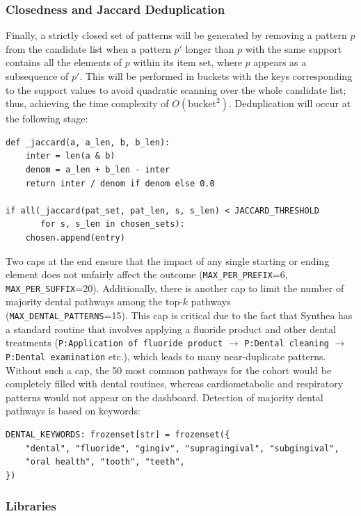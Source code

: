 \subsubsection*{Closedness and Jaccard Deduplication}

Finally, a strictly closed set of patterns will be generated by removing a pattern \(p\) from the candidate list when a pattern \(p'\) longer than \(p\) with the same support contains all the elements of \(p\) within its item set, where \(p\) appears as a subsequence of \(p'\). This will be performed in buckets with the keys corresponding to the support values to avoid quadratic scanning over the whole candidate list; thus, achieving the time complexity of \(O(\text{bucket}^2)\). Deduplication will occur at the following stage:

\begin{lstlisting}[style=pythonstyle]
def _jaccard(a, a_len, b, b_len):
    inter = len(a & b)
    denom = a_len + b_len - inter
    return inter / denom if denom else 0.0

if all(_jaccard(pat_set, pat_len, s, s_len) < JACCARD_THRESHOLD
       for s, s_len in chosen_sets):
    chosen.append(entry)
\end{lstlisting}

Two caps at the end ensure that the impact of any single starting or ending element does not unfairly affect the outcome (\texttt{MAX\_PER\_PREFIX}=6, \texttt{MAX\_PER\_SUFFIX}=20). Additionally, there is another cap to limit the number of majority dental pathways among the top-\(k\) pathways (\texttt{MAX\_DENTAL\_PATTERNS}=15). This cap is critical due to the fact that Synthea has a standard routine that involves applying a fluoride product and other dental treatments (\texttt{P:Application of fluoride product} \(\rightarrow\) \texttt{P:Dental cleaning} \(\rightarrow\) \texttt{P:Dental examination} etc.), which leads to many near-duplicate patterns. Without such a cap, the 50 most common pathways for the cohort would be completely filled with dental routines, whereas cardiometabolic and respiratory patterns would not appear on the dashboard. Detection of majority dental pathways is based on keywords:

\begin{lstlisting}[style=pythonstyle]
DENTAL_KEYWORDS: frozenset[str] = frozenset({
    "dental", "fluoride", "gingiv", "supragingival", "subgingival",
    "oral health", "tooth", "teeth",
})
\end{lstlisting}

\subsubsection*{Libraries}


